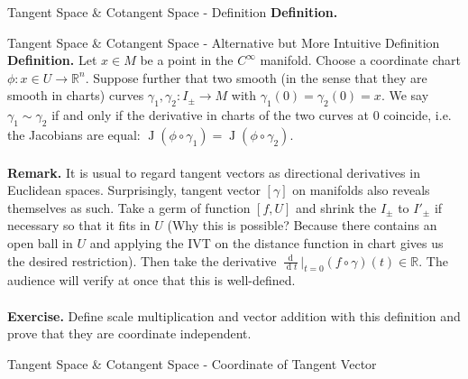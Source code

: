 \documentclass[aspectratio=169]{beamer}
\begin{document}
\begin{frame}{Tangent Space \& Cotangent Space - Definition}
\textbf{Definition.} 
\end{frame}
\begin{frame}{Tangent Space \& Cotangent Space - Alternative but More Intuitive Definition}
\textbf{Definition.} Let $x\in M$ be a point in the $C^\infty$ manifold. Choose a coordinate chart $\phi:x\in U\to\mathbb{R}^n$. Suppose further that two smooth (in the sense that they are smooth in charts) curves $\gamma_1,\gamma_2:I_\pm\to M$ with $\gamma_1(0)=\gamma_2(0)=x$. We say $\gamma_1\sim\gamma_2$ if and only if the derivative in charts of the two curves at $0$ coincide, i.e. the Jacobians are equal: $\operatorname{J}(\phi\circ\gamma_1)=\operatorname{J}(\phi\circ\gamma_2)$.
\\~\\
\textbf{Remark.} It is usual to regard tangent vectors as directional derivatives in Euclidean spaces. Surprisingly, tangent vector $[\gamma]$ on manifolds also reveals themselves as such. Take a germ of function $[f,U]$ and shrink the $I_\pm$ to $I'_\pm$ if necessary so that it fits in $U$ (Why this is possible? Because there contains an open ball in $U$ and applying the IVT on the distance function in chart gives us the desired restriction). Then take the derivative $\frac{\operatorname{d}}{\operatorname{d}t}\big|_{t=0}(f\circ\gamma)(t)\in\mathbb{R}$. The audience will verify at once that this is well-defined.
\\~\\
\textbf{Exercise.} Define scale multiplication and vector addition with this definition and prove that they are coordinate independent.
\end{frame}
\begin{frame}{Tangent Space \& Cotangent Space - Coordinate of Tangent Vector}

\end{frame}
\begin{frame}{}
\end{frame}
\begin{frame}{}
\end{frame}
\begin{frame}{}
\end{frame}
\begin{frame}{}
\end{frame}
\begin{frame}{}
\end{frame}
\begin{frame}{}
\end{frame}
\end{document}

